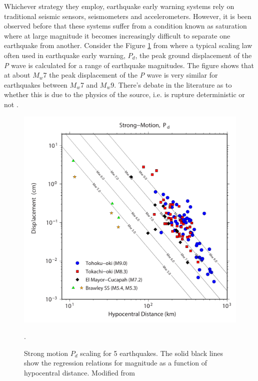 Whichever strategy they employ, earthquake early warning systems rely on traditional seismic sensors, seismometers and accelerometers. However, it is been observed before that these systems suffer from a condition known as saturation \citep{Brown2011} where at large magnitude it becomes increasingly difficult to separate one earthquake from another. Consider the Figure \ref{fig_pd_scaling} from \citet{Crowell2013} where a typical scaling law often used in earthquake early warning, $P_d$, the peak ground displacement of the \textit{P} wave \citep{wu2007_Pd} is calculated for a range of earthquake magnitudes. The figure shows that at about $M_w$7 the peak displacement of the \textit{P} wave is very similar for earthquakes between $M_w$7 and $M_w$9. There's debate in the literature as to whether this is due to the physics of the source, i.e. is rupture deterministic or not \citep{olson2005}.

\begin{figure}[!ht] 
  \centering
  \includegraphics[width=0.99\linewidth]{./figures/ch1/pd_scaling.pdf}
    \caption[Strong motion $P_d$ scaling]{Strong motion $P_d$ scaling for 5 earthquakes. The solid black lines show the regression relations for magnitude as a function of hypocentral distance. Modified from \citep{Crowell2013}}.
  \label{fig_pd_scaling}
\end{figure}

